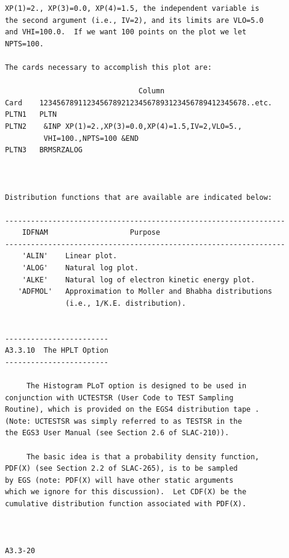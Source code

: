 \newpage {} \begin{verbatim}
 XP(1)=2., XP(3)=0.0, XP(4)=1.5, the independent variable is
 the second argument (i.e., IV=2), and its limits are VLO=5.0
 and VHI=100.0.  If we want 100 points on the plot we let
 NPTS=100.

 The cards necessary to accomplish this plot are:

                                Column
 Card    123456789112345678921234567893123456789412345678..etc.
 PLTN1   PLTN
 PLTN2    &INP XP(1)=2.,XP(3)=0.0,XP(4)=1.5,IV=2,VLO=5.,
          VHI=100.,NPTS=100 &END
 PLTN3   BRMSRZALOG



 Distribution functions that are available are indicated below:

 -----------------------------------------------------------------
     IDFNAM                   Purpose
 -----------------------------------------------------------------
     'ALIN'    Linear plot.
     'ALOG'    Natural log plot.
     'ALKE'    Natural log of electron kinetic energy plot.
    'ADFMOL'   Approximation to Moller and Bhabha distributions
               (i.e., 1/K.E. distribution).


 ------------------------
 A3.3.10  The HPLT Option
 ------------------------

      The Histogram PLoT option is designed to be used in
 conjunction with UCTESTSR (User Code to TEST Sampling
 Routine), which is provided on the EGS4 distribution tape .
 (Note: UCTESTSR was simply referred to as TESTSR in the
 the EGS3 User Manual (see Section 2.6 of SLAC-210)).

      The basic idea is that a probability density function,
 PDF(X) (see Section 2.2 of SLAC-265), is to be sampled
 by EGS (note: PDF(X) will have other static arguments
 which we ignore for this discussion).  Let CDF(X) be the
 cumulative distribution function associated with PDF(X).



 A3.3-20
\end{verbatim}
